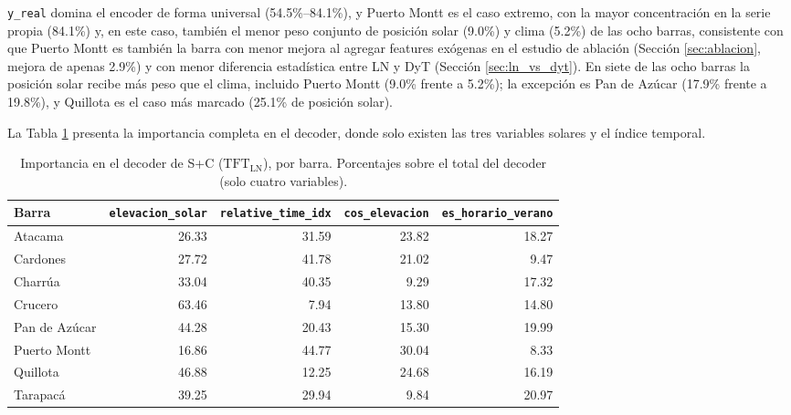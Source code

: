 \texttt{y\_real} domina el encoder de forma universal (54.5\%--84.1\%), y Puerto Montt es el caso extremo, con la mayor concentración en la serie propia (84.1\%) y, en este caso, también el menor peso conjunto de posición solar (9.0\%) y clima (5.2\%) de las ocho barras, consistente con que Puerto Montt es también la barra con menor mejora al agregar features exógenas en el estudio de ablación (Sección \ref{sec:ablacion}, mejora de apenas 2.9\%) y con menor diferencia estadística entre LN y DyT (Sección \ref{sec:ln_vs_dyt}). En siete de las ocho barras la posición solar recibe más peso que el clima, incluido Puerto Montt (9.0\% frente a 5.2\%); la excepción es Pan de Azúcar (17.9\% frente a 19.8\%), y Quillota es el caso más marcado (25.1\% de posición solar).

La Tabla \ref{tab:importancia_sc_decoder} presenta la importancia completa en el decoder, donde solo existen las tres variables solares y el índice temporal.

\begin{table}[htbp]
    \centering
    \small
    \setlength{\tabcolsep}{4pt}
    \begin{tabular}{lrrrr}
        \toprule
        Barra & \texttt{elevacion\_solar} & \texttt{relative\_time\_idx} & \texttt{cos\_elevacion} & \texttt{es\_horario\_verano} \\
        \midrule
        Atacama       & 26.33 & 31.59 & 23.82 & 18.27 \\
        Cardones      & 27.72 & 41.78 & 21.02 &  9.47 \\
        Charrúa       & 33.04 & 40.35 &  9.29 & 17.32 \\
        Crucero       & 63.46 &  7.94 & 13.80 & 14.80 \\
        Pan de Azúcar & 44.28 & 20.43 & 15.30 & 19.99 \\
        Puerto Montt  & 16.86 & 44.77 & 30.04 &  8.33 \\
        Quillota      & 46.88 & 12.25 & 24.68 & 16.19 \\
        Tarapacá      & 39.25 & 29.94 &  9.84 & 20.97 \\
        \bottomrule
    \end{tabular}
    \vspace{0.2cm}
    \caption{Importancia en el decoder de S+C ($\text{TFT}_\text{LN}$), por barra. Porcentajes sobre el total del decoder (solo cuatro variables).}
    \label{tab:importancia_sc_decoder}
\end{table}

